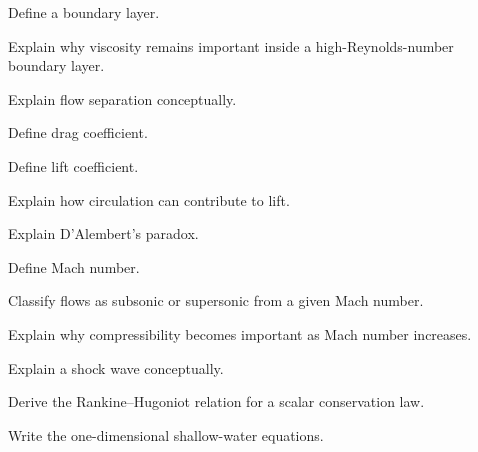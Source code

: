\begin{exercise}[2]
Define a boundary layer.
\end{exercise}

\begin{exercise}[3]
Explain why viscosity remains important inside a high-Reynolds-number
boundary layer.
\end{exercise}

\begin{exercise}[3]
Explain flow separation conceptually.
\end{exercise}

\begin{exercise}[2]
Define drag coefficient.
\end{exercise}

\begin{exercise}[2]
Define lift coefficient.
\end{exercise}

\begin{exercise}[3]
Explain how circulation can contribute to lift.
\end{exercise}

\begin{exercise}[3]
Explain D'Alembert's paradox.
\end{exercise}

\begin{exercise}[2]
Define Mach number.
\end{exercise}

\begin{exercise}[2]
Classify flows as subsonic or supersonic from a given Mach number.
\end{exercise}

\begin{exercise}[3]
Explain why compressibility becomes important as Mach number increases.
\end{exercise}

\begin{exercise}[3]
Explain a shock wave conceptually.
\end{exercise}

\begin{exercise}[3]
Derive the Rankine--Hugoniot relation for a scalar conservation law.
\end{exercise}

\begin{exercise}[2]
Write the one-dimensional shallow-water equations.
\end{exercise}

